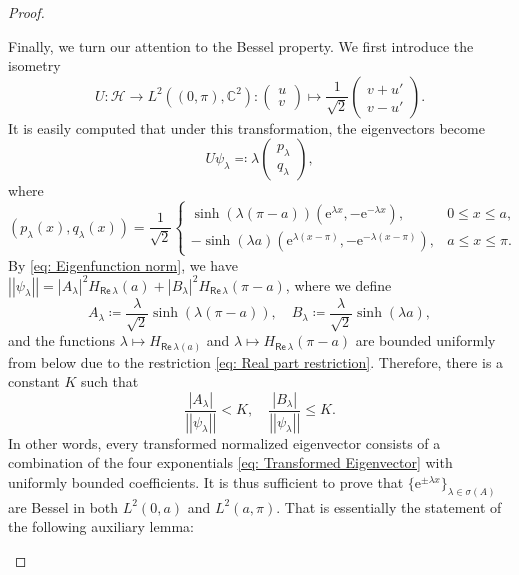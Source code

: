 \documentclass[11pt, a4paper,reqno]{amsart}
\theoremstyle{plain}
\theoremstyle{definition}
\theoremstyle{remark}
\newcommand{\norm}[1]{\left|\left|#1\right|\right|}
\renewcommand{\leq}{\leqslant}	\renewcommand{\geq}{\geqslant}
\newcommand{\1}{\mathds 1}
\renewcommand{\Re}{\mathsf{Re}\,}
\begin{document}
\begin{proof}
\begin{enumerate}
        Finally, we turn our attention to the Bessel property. We first introduce the isometry
        \[
        U:\mathcal H \to L^2((0,\pi), \mathbb C^2) : \begin{pmatrix}
            u \\ v
        \end{pmatrix} \mapsto \frac{1}{\sqrt{2}}\begin{pmatrix}
            v + u' \\
            v - u'
        \end{pmatrix}.
        \]
        It is easily computed that under this transformation, the eigenvectors become
        \[
        U\psi_\lambda \eqqcolon \lambda \begin{pmatrix} p_\lambda \\ q_\lambda\end{pmatrix},
        \]
        where
        \begin{equation}
        (p_\lambda(x), q_\lambda(x)) = \frac{1}{\sqrt{2}}\begin{cases}
            \sinh(\lambda(\pi-a))(\mathrm{e}^{\lambda x}, -\mathrm{e}^{-\lambda x}), & 0 \leq x \leq a,\\
            -\sinh(\lambda a)(\mathrm{e}^{\lambda(x-\pi)}, - \mathrm{e}^{-\lambda(x-\pi)}), & a \leq x \leq \pi.
        \end{cases}
        \label{eq: Transformed Eigenvector}
        \end{equation}
        By \eqref{eq: Eigenfunction norm}, we have $\norm{\psi_\lambda} = |A_\lambda|^2H_{\Re \lambda}(a) + |B_\lambda|^2H_{\Re\lambda}(\pi-a)$, where we define
        \[
        A_\lambda \coloneqq \frac{\lambda}{\sqrt{2}}\sinh(\lambda (\pi-a)), \quad B_\lambda \coloneqq \frac{\lambda}{\sqrt{2}}\sinh(\lambda a),
        \]
        and the functions $\lambda \mapsto H_{\Re \lambda (a)}$ and $\lambda \mapsto H_{\Re \lambda}(\pi -a)$ are bounded uniformly from below due to the restriction \eqref{eq: Real part restriction}. Therefore, there is a constant $K$ such that
        \[
        \frac{| A_\lambda|}{\norm{\psi_\lambda}} < K, \quad \frac{|B_\lambda|}{\norm{\psi_\lambda}} \leq K.
        \]
        In other words, every transformed normalized eigenvector consists of a combination of the four exponentials \eqref{eq: Transformed Eigenvector} with uniformly bounded coefficients. It is thus sufficient to prove that $\{\mathrm{e}^{\pm\lambda x}\}_{\lambda \in \sigma(A)}$ are Bessel in both $L^2(0, a)$ and $L^2(a, \pi)$. That is essentially the statement of the following auxiliary lemma:


\end{enumerate}
\end{proof}
\end{document}
